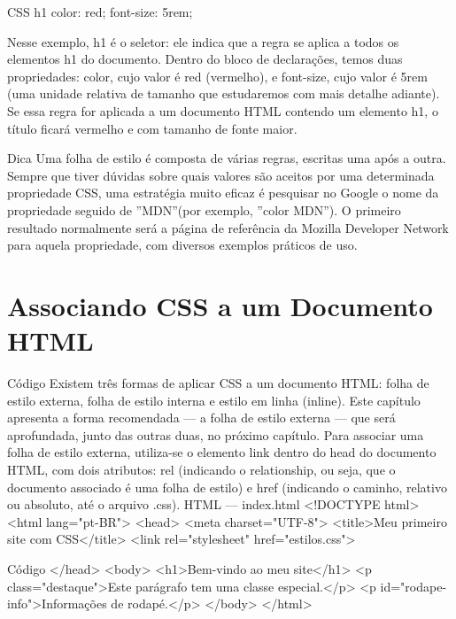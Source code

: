 \begin{codebox}{CSS}
 h1 {
   color: red;
   font-size: 5rem;
 }
\end{codebox}

Nesse exemplo, h1 é o seletor: ele indica que a regra se aplica a todos os elementos h1 do documento. Dentro do bloco de declarações, temos duas propriedades: color, cujo valor é red (vermelho), e font-size, cujo valor é 5rem (uma unidade relativa de tamanho que estudaremos com mais detalhe adiante). Se essa regra for aplicada a um documento HTML contendo um elemento h1, o título ficará vermelho e com tamanho de fonte maior.

\begin{infobox}{Dica}
Uma folha de estilo é composta de várias regras, escritas uma após a outra. Sempre que tiver dúvidas sobre quais valores são aceitos por uma determinada propriedade CSS, uma estratégia muito eficaz é pesquisar no Google o nome da propriedade seguido de ”MDN”(por exemplo, ”color MDN”). O primeiro resultado normalmente será a página de referência da Mozilla Developer Network para aquela propriedade, com diversos exemplos práticos de uso.
\end{infobox}

\section{Associando CSS a um Documento HTML}

\begin{codebox}{Código}
Existem três formas de aplicar CSS a um documento HTML: folha de estilo externa,
folha de estilo interna e estilo em linha (inline). Este capítulo apresenta a forma
recomendada — a folha de estilo externa — que será aprofundada, junto das outras
duas, no próximo capítulo.
Para associar uma folha de estilo externa, utiliza-se o elemento link dentro do
head do documento HTML, com dois atributos: rel (indicando o relationship, ou
seja, que o documento associado é uma folha de estilo) e href (indicando o caminho,
relativo ou absoluto, até o arquivo .css).
HTML — index.html
<!DOCTYPE html>
<html lang="pt-BR">
<head>
<meta charset="UTF-8">
<title>Meu primeiro site com CSS</title>
<link rel="stylesheet" href="estilos.css">
\end{codebox}

\begin{codebox}{Código}
</head>
<body>
<h1>Bem-vindo ao meu site</h1>
<p class="destaque">Este parágrafo tem uma classe especial.</p>
<p id="rodape-info">Informações de rodapé.</p>
</body>
</html>
\end{codebox}

